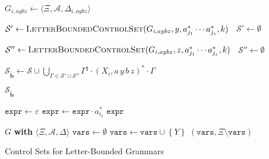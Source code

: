 \documentclass[final]{llncs}
\def\set#1{{\left\{ #1 \right\}}}
\def\tuple#1{{\langle #1 \rangle}}
\def\prod{\Delta}
\def\patt{{\widetilde{\mathbf{b}}}}
\def\Vars{\ensuremath{\Xi}}
\begin{document}
\begin{algorithm}[p]
{\begin{algorithmic}[1]
  \State $G_{i,aybz} \leftarrow \tuple{\Vars, \mathcal{A}, \prod_{i,aybz}}$

  \If{$y \in \Vars$}
	\State $\mathcal{S}' \leftarrow \Call{LetterBoundedControlSet}{G_{i,aybz}, y, a_{j_1}^* \cdots a_{j_s}^*, k}$
  \label{line:rec-y}
  \Else~$\mathcal{S}' \leftarrow \emptyset$  
  
  \EndIf

  \If{$z \in \Vars$}
	\State $\mathcal{S}'' \leftarrow \Call{LetterBoundedControlSet}{G_{i,aybz}, z, a_{j_1}^* \cdots a_{j_s}^*, k}$
  \label{line:rec-z}
  \Else~$\mathcal{S}'' \leftarrow \emptyset$  
  \EndIf

	\State \(\mathcal{S}_{\patt} \leftarrow \mathcal{S} \cup 
  \bigcup_{\Gamma \in \mathcal{S}' \cup \mathcal{S}''} \Gamma^\sharp \cdot (X_i, a\,y\,b\,z)^* \cdot \Gamma\)
  \label{line:concatpattg}
  
  \EndIf \EndFor \label{line:for-end}

	 $\mathcal{S}_{\patt}$
\EndFunction
\end{algorithmic}
\begin{algorithmic}[1]
  \State $\mathtt{expr} \leftarrow \varepsilon$
		\State $\mathtt{expr} \leftarrow \mathtt{expr} \cdot a_{i_{\ell}}^*$
  \EndIf 
  \EndFor
   $\mathtt{expr}$
  \EndFunction
\end{algorithmic}
\begin{algorithmic}[1]
   $G$ {\bf with} $\tuple{\Vars, \mathcal{A}, \prod}$ 
  \State $\mathtt{vars} \leftarrow \emptyset$
  \For{$Y \in \Vars$}
  \State $\mathtt{vars} \leftarrow \mathtt{vars} \cup \set{Y}$
  \EndIf
  \EndFor
   $(\mathtt{vars},\Vars\setminus\mathtt{vars})$
  \EndFunction
\end{algorithmic}
\caption{Control Sets for Letter-Bounded Grammars}\label{alg:bounded-control-set}
}
\end{algorithm}
\end{document}
